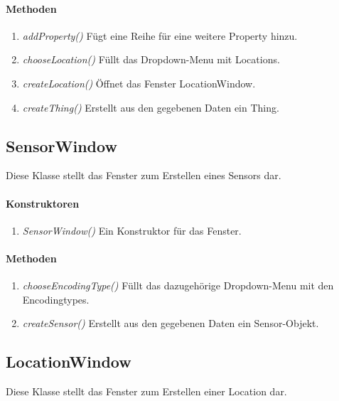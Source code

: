 \paragraph{Methoden}

\begin{enumerate}[+]
	\item \textit{addProperty()} Fügt eine Reihe für eine weitere Property hinzu.
	\item \textit{chooseLocation()} Füllt das Dropdown-Menu mit Locations. 
	\item \textit{createLocation()} Öffnet das Fenster LocationWindow.
	\item \textit{createThing()} Erstellt aus den gegebenen Daten ein Thing.
\end{enumerate}



\subsection*{SensorWindow}\label{SensorWindow}
Diese Klasse stellt das Fenster zum Erstellen eines Sensors dar.

\paragraph{Konstruktoren}
\begin{enumerate}[+]
	\item \textit{SensorWindow()} Ein Konstruktor für das Fenster.
\end{enumerate}

\paragraph{Methoden}

\begin{enumerate}[+]
	\item \textit{chooseEncodingType()} Füllt das dazugehörige Dropdown-Menu mit den Encodingtypes.
	\item \textit{createSensor()} Erstellt aus den gegebenen Daten ein Sensor-Objekt.
		
\end{enumerate}



\subsection*{LocationWindow}\label{LocationWindow}
Diese Klasse stellt das Fenster zum Erstellen einer Location dar.

